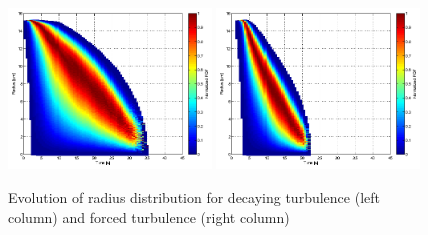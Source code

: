 \documentclass[12pt]{article}
\begin{document}
\begin{figure}[H]
\includegraphics[width=0.48\textwidth]{Figures/pdf_radius_d3}
\includegraphics[width=0.48\textwidth]{Figures/pdf_radius_f3}
\caption{Evolution of radius distribution for decaying turbulence (left column) 
and forced turbulence (right column)}
\end{figure}
\end{document}
